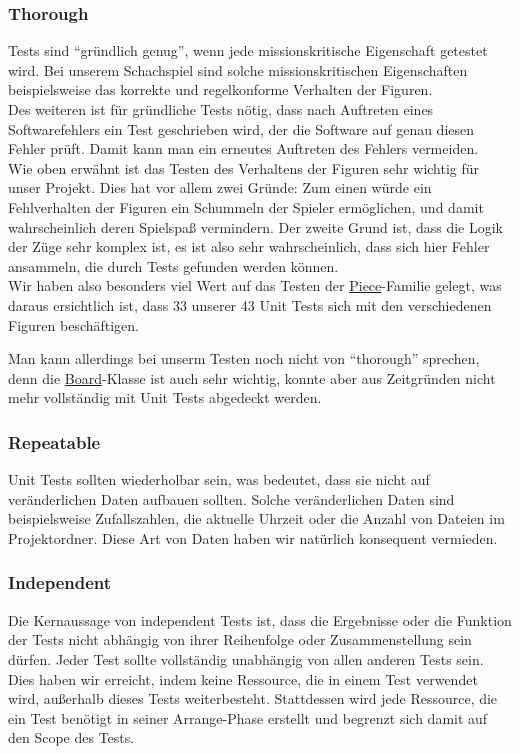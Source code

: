 \documentclass[
10pt, %
a4paper, %
oneside, %
headinclude,footinclude, %
BCOR5mm, %
]{scrartcl}
\begin{document}
\begin{onehalfspace}
\subsubsection{Thorough}
Tests sind \enquote{gründlich genug}, wenn jede missionskritische Eigenschaft getestet wird. Bei unserem Schachspiel sind solche missionskritischen Eigenschaften beispielsweise das korrekte und regelkonforme Verhalten der Figuren. 
\\
Des weiteren ist für gründliche Tests nötig, dass nach Auftreten eines Softwarefehlers ein Test geschrieben wird, der die Software auf genau diesen Fehler prüft. Damit kann man ein erneutes Auftreten des Fehlers vermeiden.
\\
Wie oben erwähnt ist das Testen des Verhaltens der Figuren sehr wichtig für unser Projekt. Dies hat vor allem zwei Gründe:
Zum einen würde ein Fehlverhalten der Figuren ein Schummeln der Spieler ermöglichen, und damit wahrscheinlich deren Spielspaß vermindern. 
Der zweite Grund ist, dass die Logik der Züge sehr komplex ist, es ist also sehr wahrscheinlich, dass sich hier Fehler ansammeln, die durch Tests gefunden werden können.
\\
Wir haben also besonders viel Wert auf das Testen der \href{https://github.com/schmida736/Chess-AdvancedSE/blob/main/Chess-AdvancedSE/Game\%20Elements/Pieces/Piece.cs}{Piece}-Familie gelegt, was daraus ersichtlich ist, dass 33 unserer 43 Unit Tests sich mit den verschiedenen Figuren beschäftigen.

Man kann allerdings bei unserm Testen noch nicht von \enquote{thorough} sprechen, denn die \href{https://github.com/schmida736/Chess-AdvancedSE/blob/main/Chess-AdvancedSE/Game\%20Elements/Board.cs}{Board}-Klasse ist auch sehr wichtig, konnte aber aus Zeitgründen nicht mehr vollständig mit Unit Tests abgedeckt werden.

\subsubsection{Repeatable}
Unit Tests sollten wiederholbar sein, was bedeutet, dass sie nicht auf veränderlichen Daten aufbauen sollten. Solche veränderlichen Daten sind beispielsweise Zufallszahlen, die aktuelle Uhrzeit oder die Anzahl von Dateien im Projektordner. Diese Art von Daten haben wir natürlich konsequent vermieden.
\subsubsection{Independent}
Die Kernaussage von independent Tests ist, dass die Ergebnisse oder die Funktion der Tests nicht abhängig von ihrer Reihenfolge oder Zusammenstellung sein dürfen. Jeder Test sollte vollständig unabhängig von allen anderen Tests sein. Dies haben wir erreicht, indem keine Ressource, die in einem Test verwendet wird, außerhalb dieses Tests weiterbesteht. Stattdessen wird jede Ressource, die ein Test benötigt in seiner Arrange-Phase erstellt und begrenzt sich damit auf den Scope des Tests.

\end{onehalfspace}
\end{document}

